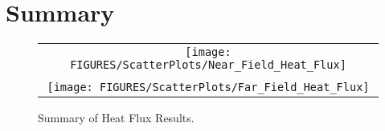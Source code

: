 \clearpage

\section{Summary}

\begin{figure}[p]
\begin{center}
\begin{tabular}{c}
\texttt{[image: FIGURES/ScatterPlots/Near\_Field\_Heat\_Flux]} \\
\vspace{0.25in} \\
\texttt{[image: FIGURES/ScatterPlots/Far\_Field\_Heat\_Flux]}
\vspace{0.25in}
\end{tabular}
\end{center}
\caption{Summary of Heat Flux Results.}
\end{figure}



